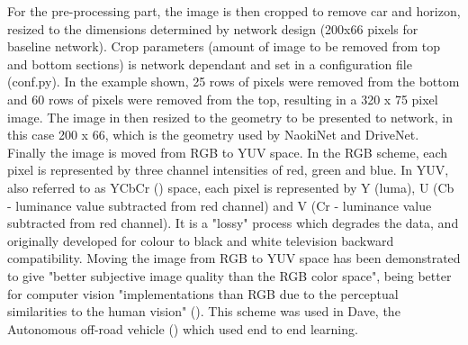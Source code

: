 For the pre-processing part, the image is then cropped to remove car and horizon, resized to the dimensions determined by network design (200x66 pixels for baseline network). Crop parameters (amount of image to be removed from top and bottom sections) is network dependant and set in a configuration file (conf.py). In the example shown, 25 rows of pixels were removed from the bottom and 60 rows of pixels were removed from the top, resulting in a 320 x 75 pixel image. The image in then resized to the geometry to be presented to network, in this case 200 x 66, which is the geometry used by NaokiNet and DriveNet. Finally the image is moved from RGB to YUV space. In the RGB scheme, each pixel is represented by three channel intensities of red, green and blue. In YUV, also referred to as YCbCr (\cite{maller2020}) space, each pixel is represented by Y (luma), U (Cb - luminance value subtracted from red channel) and V (Cr - luminance value subtracted from red channel). It is a "lossy" process which degrades the data, and originally developed for colour to black and white television backward compatibility. Moving the image from RGB to YUV space has been demonstrated to give "better subjective image quality than the RGB color space", being better for computer vision "implementations than RGB due to the perceptual similarities to the human vision" (\cite{podpora2014yuv}). This scheme was used in Dave, the Autonomous off-road vehicle (\cite{lecun2004dave}) which used end to end learning.









